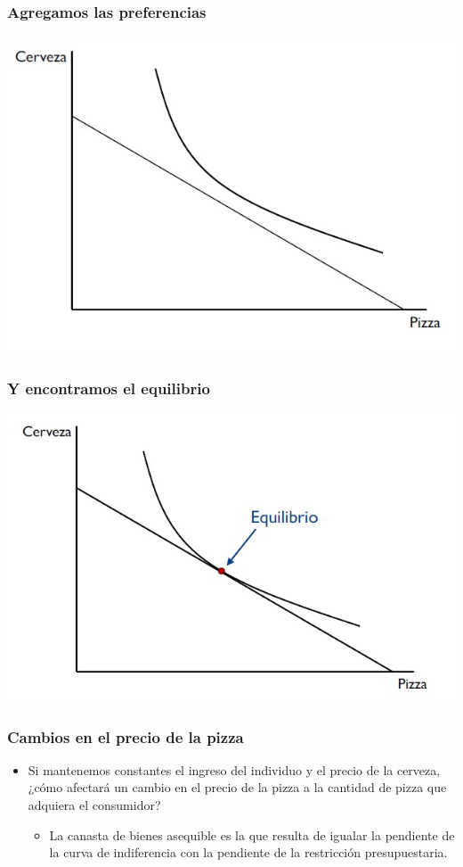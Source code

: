 \documentclass{beamer}
\begin{document}
\begin{frame}
\frametitle{Agregamos las preferencias}
\centering
\includegraphics[scale=0.6]{Slides Principios de Economia/Figures/Tema_02.18_rp16.jpg}
\end{frame}

\begin{frame}
\frametitle{Y encontramos el equilibrio}
\centering
\includegraphics[scale=0.6]{Slides Principios de Economia/Figures/Tema_02.19_rp17.jpg}
\end{frame}

\begin{frame}
\frametitle{Cambios en el precio de la pizza}
\begin{itemize}
    \item Si mantenemos constantes el ingreso del individuo y el precio de la cerveza, ¿cómo afectará un cambio en el precio de la pizza a la cantidad de pizza que adquiera el consumidor? \vspace{2mm}
    \begin{itemize}
         \item La canasta de bienes asequible es la que resulta de igualar la pendiente de la curva de indiferencia con la pendiente de la restricción presupuestaria. 
    \end{itemize}
\end{itemize}
\end{frame}
\end{document}

